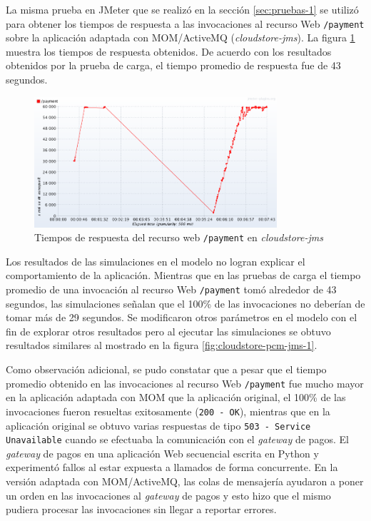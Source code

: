 \documentclass[article]{IEEEtran}
\begin{document}
La misma prueba en JMeter que se realizó en la sección \ref{sec:pruebas-1} se utilizó para obtener los tiempos de respuesta a las invocaciones al recurso Web \texttt{/payment} sobre la aplicación adaptada con MOM/ActiveMQ (\emph{cloudstore-jms}). La figura \ref{fig:cloudstore-jmeter-jms-1} muestra los tiempos de respuesta obtenidos. De acuerdo con los resultados obtenidos por la prueba de carga, el tiempo promedio de respuesta fue de 43 segundos.

\begin{figure}[h]
  \centering
  \includegraphics[width=9cm]{cloudstore-jms-aws-1}
  \caption{\small{Tiempos de respuesta del recurso web \texttt{/payment} en \emph{cloudstore-jms}}}
  \label{fig:cloudstore-jmeter-jms-1}
\end{figure}

Los resultados de las simulaciones en el modelo no logran explicar el comportamiento de la aplicación. Mientras que en las pruebas de carga el tiempo promedio de una invocación al recurso Web \texttt{/payment} tomó alrededor de 43 segundos, las simulaciones señalan que el 100\% de las invocaciones no deberían de tomar más de 29 segundos. Se modificaron otros parámetros en el modelo con el fin de explorar otros resultados pero al ejecutar las simulaciones se obtuvo resultados similares al mostrado en la figura \ref{fig:cloudstore-pcm-jms-1}. 

Como observación adicional, se pudo constatar que a pesar que el tiempo promedio obtenido en las invocaciones al recurso Web \texttt{/payment} fue mucho mayor en la aplicación adaptada con MOM que la aplicación original, el 100\% de las invocaciones fueron resueltas exitosamente (\texttt{200 - OK}), mientras que en la aplicación original se obtuvo varias respuestas de tipo \texttt{503 - Service Unavailable} cuando se efectuaba la comunicación con el \emph{gateway} de pagos. El \emph{gateway} de pagos en una aplicación Web secuencial escrita en Python y experimentó fallos al estar expuesta a llamados de forma concurrente. En la versión adaptada con MOM/ActiveMQ, las colas de mensajería ayudaron a poner un orden en las invocaciones al \emph{gateway} de pagos y esto hizo que el mismo pudiera procesar las invocaciones sin llegar a reportar errores.
\end{document}
